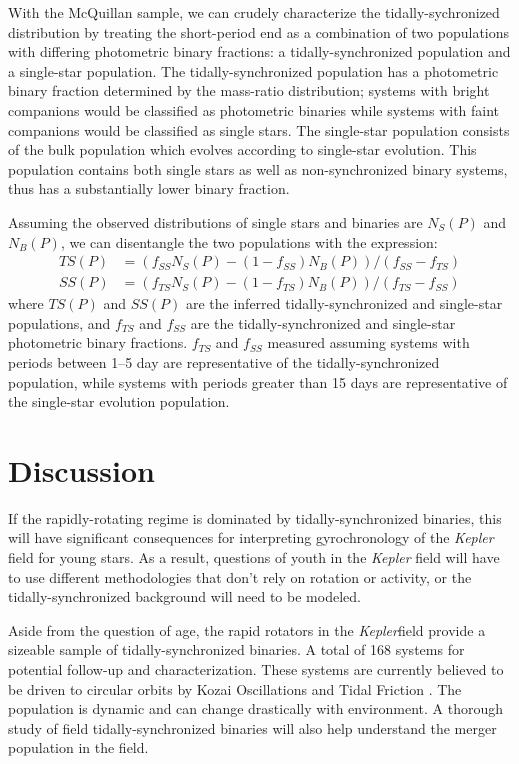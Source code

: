 \documentclass[manuscript]{aastex6}
\newcommand{\Kepler}{\mbox{\textit{Kepler}}}
\begin{document}
With the McQuillan sample, we can crudely characterize the tidally-sychronized
distribution by treating the short-period end as a combination of two
populations with differing photometric binary fractions: a tidally-synchronized
population and a single-star population. The tidally-synchronized population
has a photometric binary fraction determined by the mass-ratio distribution;
systems with bright companions would be classified as photometric binaries 
while systems with faint companions would be classified as single stars. The
single-star population consists of the bulk population which evolves according
to single-star evolution. This population contains both single
stars as well as non-synchronized binary systems, thus has a substantially 
lower binary fraction.

Assuming the observed distributions of single stars and binaries are \(N_S(P)\)
and \(N_B(P)\), we can disentangle the two populations with the expression:
\begin{align}
    TS(P) &= (f_{SS} N_S(P) - (1-f_{SS}) N_B(P)) / (f_{SS}-f_{TS}) \\
    SS(P) &= (f_{TS} N_S(P) - (1-f_{TS}) N_B(P)) / (f_{TS}-f_{SS})
    \label{eq:synchpop}
\end{align}
where \(TS(P)\) and \(SS(P)\) are the inferred tidally-synchronized and
single-star populations, and \(f_{TS}\) and \(f_{SS}\) are the
tidally-synchronized and single-star photometric binary fractions. \(f_{TS}\)
and \(f_{SS}\) measured assuming systems with periods between 1--5 day are representative
of the tidally-synchronized population, while systems with periods greater than
15 days are representative of the single-star evolution population.

\section{Discussion}
\label{sec:discussion}

If the rapidly-rotating regime is dominated by tidally-synchronized binaries,
this will have significant consequences for interpreting gyrochronology of the
\Kepler{} field for young stars. As a result, questions of youth in the
\Kepler{} field will have to use different methodologies that don't rely on
rotation or activity, or the tidally-synchronized background will need to be
modeled. 

Aside from the question of age, the rapid rotators in the \Kepler field provide
a sizeable sample of tidally-synchronized binaries. A total of 168 systems for
potential follow-up and characterization. These systems are currently believed
to be driven to circular orbits by Kozai Oscillations and Tidal Friction
\citep{Fabrycky07}. The population is dynamic and can change drastically with
environment. A thorough study of field tidally-synchronized binaries will also
help understand the merger population in the field.
\end{document}

